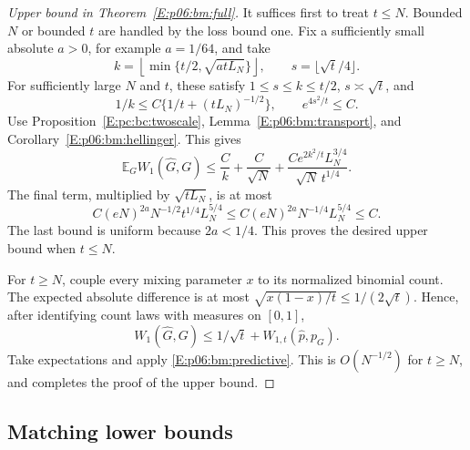 \documentclass[11pt,a4paper]{article}
\theoremstyle{definition}
\theoremstyle{remark}
\numberwithin{equation}{section}
\begin{document}
\begin{proof}[Upper bound in Theorem~\ref{E:p06:bm:full}]
It suffices first to treat $t\le N$. Bounded $N$ or bounded $t$ are handled
by the loss bound one. Fix a sufficiently small absolute $a>0$, for
example $a=1/64$, and take
\[
 k=\left\lfloor\min\{t/2,\sqrt{atL_N}\}\right\rfloor,
 \qquad s=\lfloor\sqrt t/4\rfloor.
\]
For sufficiently large $N$ and $t$, these satisfy
$1\le s\le k\le t/2$, $s\asymp\sqrt t$, and
\[
 1/k\le C\{1/t+(tL_N)^{-1/2}\},\qquad e^{4s^2/t}\le C.
\]
Use Proposition~\ref{E:pc:bc:twoscale}, Lemma~\ref{E:p06:bm:transport}, and
Corollary~\ref{E:p06:bm:hellinger}. This gives
\begin{equation}\label{E:p06:bm:master}
 \mathbb E_G W_1(\widehat G,G)
 \le \frac Ck+\frac C{\sqrt N}
       +\frac{Ce^{2k^2/t}L_N^{3/4}}{\sqrt N\,t^{1/4}}.
\end{equation}
The final term, multiplied by $\sqrt{tL_N}$, is at most
\[
 C(eN)^{2a}N^{-1/2}t^{1/4}L_N^{5/4}
 \le C(eN)^{2a}N^{-1/4}L_N^{5/4}\le C.
\]
The last bound is uniform because $2a<1/4$. This proves the desired
upper bound when $t\le N$.

For $t\ge N$, couple every mixing parameter $x$ to its normalized
binomial count. The expected absolute difference is at most
$\sqrt{x(1-x)/t}\le1/(2\sqrt t)$. Hence, after identifying count laws
with measures on $[0,1]$,
\[
 W_1(\widehat G,G)
 \le 1/\sqrt t+W_{1,t}(\widehat p,p_G).
\]
Take expectations and apply \eqref{E:p06:bm:predictive}. This is $O(N^{-1/2})$
for $t\ge N$, and completes the proof of the upper bound.
\end{proof}

\subsection{Matching lower bounds}
\end{document}
